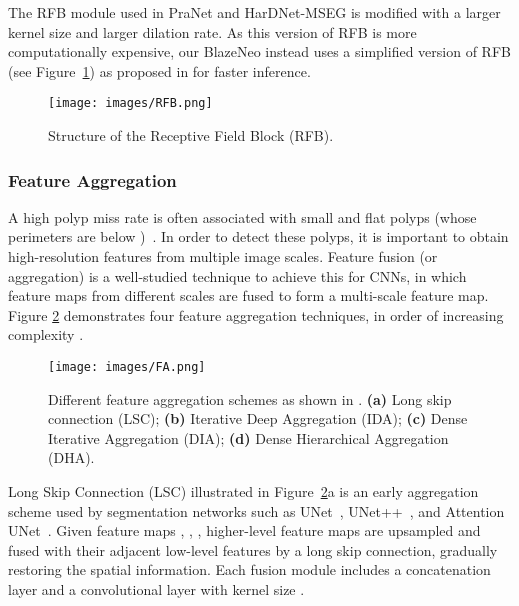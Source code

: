 \documentclass{ieeeaccess}
\newcommand{\ModelName}{BlazeNeo\xspace}
\begin{document}
The RFB module used in PraNet \cite{fan2020pranet} and HarDNet-MSEG \cite{huang2021hardnet} is modified with a larger kernel size and larger dilation rate. As this version of RFB is more computationally expensive, our \ModelName instead uses a simplified version of RFB (see Figure~\ref{fig:rfb}) as proposed in \cite{liu2018receptive} for faster inference.

\begin{center}
    \begin{figure}[th]
        \begin{center}
            \texttt{[image: images/RFB.png]}
        \end{center}
        \caption{Structure of the Receptive Field Block (RFB).}
        \label{fig:rfb}
    \end{figure}
\end{center}

\subsubsection{Feature Aggregation}
A high polyp miss rate is often associated with small and flat polyps (whose perimeters are below )~\cite{kim2017miss}. In order to detect these polyps, it is important to obtain high-resolution features from multiple image scales. Feature fusion (or aggregation) is a well-studied technique to achieve this for CNNs, in which feature maps from different scales are fused to form a multi-scale feature map. Figure \ref{fig:fa} demonstrates four feature aggregation techniques, in order of increasing complexity \cite{zhang2020multi}.

\begin{center}
    \begin{figure}[th]
        \begin{center}
            \texttt{[image: images/FA.png]}
        \end{center}
        \caption{Different feature aggregation schemes as shown in \cite{zhang2020multi}. \textbf{(a)} Long skip connection (LSC); \textbf{(b)} Iterative Deep Aggregation (IDA); \textbf{(c)} Dense Iterative Aggregation (DIA); \textbf{(d)} Dense Hierarchical Aggregation (DHA).}
        \label{fig:fa}
    \end{figure}
\end{center}

Long Skip Connection (LSC) illustrated in Figure~\ref{fig:fa}a is an early aggregation scheme used by segmentation networks such as UNet~\cite{ronneberger2015u}, UNet++~\cite{zhou2019unet++}, and Attention UNet~\cite{oktay2018attention}. Given feature maps , , , higher-level feature maps are upsampled and fused with their adjacent low-level features by a long skip connection, gradually restoring the spatial information. Each fusion module includes a concatenation layer and a convolutional layer with kernel size .
\end{document}
